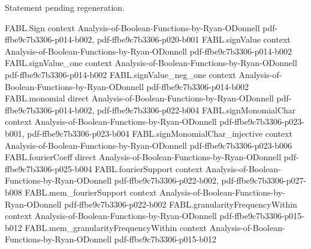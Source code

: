 \begin{theorem}
\label{FABL.biasedStandardizedSign_one_eq}
\leanok
{}
Statement pending regeneration.
\end{theorem}

\begin{theorem}
\label{FABL.biasedStandardizedSign_neg_one_eq}
\leanok
{}
\proofstep
  {FABL.Sign}
  {context}
  {Analysis-of-Boolean-Functions-by-Ryan-ODonnell}
  {pdf-ffbe9c7b3306-p014-b002,
    pdf-ffbe9c7b3306-p020-b001}
\proofstep
  {FABL.signValue}
  {context}
  {Analysis-of-Boolean-Functions-by-Ryan-ODonnell}
  {pdf-ffbe9c7b3306-p014-b002}
\proofstep
  {FABL.signValue_one}
  {context}
  {Analysis-of-Boolean-Functions-by-Ryan-ODonnell}
  {pdf-ffbe9c7b3306-p014-b002}
\proofstep
  {FABL.signValue_neg_one}
  {context}
  {Analysis-of-Boolean-Functions-by-Ryan-ODonnell}
  {pdf-ffbe9c7b3306-p014-b002}
\proofstep
  {FABL.monomial}
  {direct}
  {Analysis-of-Boolean-Functions-by-Ryan-ODonnell}
  {pdf-ffbe9c7b3306-p014-b002,
    pdf-ffbe9c7b3306-p022-b004}
\proofstep
  {FABL.signMonomialChar}
  {context}
  {Analysis-of-Boolean-Functions-by-Ryan-ODonnell}
  {pdf-ffbe9c7b3306-p023-b001,
    pdf-ffbe9c7b3306-p023-b004}
\proofstep
  {FABL.signMonomialChar_injective}
  {context}
  {Analysis-of-Boolean-Functions-by-Ryan-ODonnell}
  {pdf-ffbe9c7b3306-p023-b006}
\proofstep
  {FABL.fourierCoeff}
  {direct}
  {Analysis-of-Boolean-Functions-by-Ryan-ODonnell}
  {pdf-ffbe9c7b3306-p025-b004}
\proofstep
  {FABL.fourierSupport}
  {context}
  {Analysis-of-Boolean-Functions-by-Ryan-ODonnell}
  {pdf-ffbe9c7b3306-p022-b002,
    pdf-ffbe9c7b3306-p027-b008}
\proofstep
  {FABL.mem_fourierSupport}
  {context}
  {Analysis-of-Boolean-Functions-by-Ryan-ODonnell}
  {pdf-ffbe9c7b3306-p022-b002}
\proofstep
  {FABL.granularityFrequencyWithin}
  {context}
  {Analysis-of-Boolean-Functions-by-Ryan-ODonnell}
  {pdf-ffbe9c7b3306-p015-b012}
\proofstep
  {FABL.mem_granularityFrequencyWithin}
  {context}
  {Analysis-of-Boolean-Functions-by-Ryan-ODonnell}
  {pdf-ffbe9c7b3306-p015-b012}

\end{theorem}
